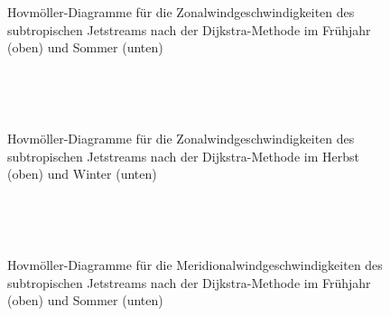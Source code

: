 \begin{figure} %
  \centering
  \begin{minipage}{\textwidth}
  \end{minipage} \\ 
    \begin{minipage}{\textwidth}
  \end{minipage} \\ 
  \caption[Hovmöllerdiagramme des Zonalwinds des Subtropenjets nach Dijkstra im Frühjahr und Sommer]{Hovmöller-Diagramme für die Zonalwindgeschwindigkeiten des subtropischen Jetstreams nach der Dijkstra-Methode im Frühjahr (oben) und Sommer (unten)}
\end{figure}

\begin{figure}
  \centering
  \begin{minipage}{\textwidth}
  \end{minipage} \\ 
    \begin{minipage}{\textwidth}
  \end{minipage} \\ 
  \caption[Hovmöllerdiagramme des Zonalwinds des Subtropenjets nach Dijkstra im Herbst und Winter]{Hovmöller-Diagramme für die Zonalwindgeschwindigkeiten des subtropischen Jetstreams nach der Dijkstra-Methode im Herbst (oben) und Winter (unten)}
\end{figure}

\begin{figure} %
  \centering
  \begin{minipage}{\textwidth}
  \end{minipage} \\ 
    \begin{minipage}{\textwidth}
  \end{minipage} \\ 
  \caption[Hovmöllerdiagramme des Meridionalwinds des Subtropenjets nach Dijkstra im Frühjahr und Sommer]{Hovmöller-Diagramme für die Meridionalwindgeschwindigkeiten des subtropischen Jetstreams nach der Dijkstra-Methode im Frühjahr (oben) und Sommer (unten)}
\end{figure}

